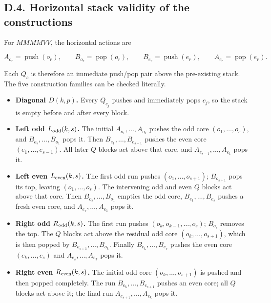 \documentclass[11pt]{article}
\theoremstyle{definition}
\theoremstyle{remark}
\providecommand{\tightlist}{\setlength{\itemsep}{0pt}\setlength{\parskip}{0pt}}
\begin{document}
\subsection{D.4. Horizontal stack validity of the
constructions}\label{d.4.-horizontal-stack-validity-of-the-constructions}

For \(MMMMVV\), the horizontal actions are

\[
A_{o_r}=\operatorname{push}(o_r),\qquad B_{o_r}=\operatorname{pop}(o_r),\qquad
B_{e_r}=\operatorname{push}(e_r),\qquad A_{e_r}=\operatorname{pop}(e_r).
\]

Each \(Q_c\) is therefore an immediate push/pop pair above the
pre-existing stack. The five construction families can be checked
literally.

\begin{itemize}
\tightlist
\item
  \textbf{Diagonal \(D(k,p)\).} Every \(Q_{c_j}\) pushes and immediately
  pops \(c_j\), so the stack is empty before and after every block.
\item
  \textbf{Left odd \(L_{\rm odd}(k,s)\).} The initial
  \(A_{o_1},\ldots,A_{o_s}\) pushes the odd core \((o_1,\ldots,o_s)\),
  and \(B_{o_s},\ldots,B_{o_1}\) pops it. Then
  \(B_{e_1},\ldots,B_{e_{s-1}}\) pushes the even core
  \((e_1,\ldots,e_{s-1})\). All later \(Q\) blocks act above that core,
  and \(A_{e_{s-1}},\ldots,A_{e_1}\) pops it.
\item
  \textbf{Left even \(L_{\rm even}(k,s)\).} The first odd run pushes
  \((o_1,\ldots,o_{s+1})\); \(B_{o_{s+1}}\) pops its top, leaving
  \((o_1,\ldots,o_s)\). The intervening odd and even \(Q\) blocks act
  above that core. Then \(B_{o_s},\ldots,B_{o_1}\) empties the odd core,
  \(B_{e_1},\ldots,B_{e_s}\) pushes a fresh even core, and
  \(A_{e_s},\ldots,A_{e_1}\) pops it.
\item
  \textbf{Right odd \(R_{\rm odd}(k,s)\).} The first run pushes
  \((o_k,o_{k-1},\ldots,o_s)\); \(B_{o_s}\) removes the top. The \(Q\)
  blocks act above the residual odd core \((o_k,\ldots,o_{s+1})\), which
  is then popped by \(B_{o_{s+1}},\ldots,B_{o_k}\). Finally
  \(B_{e_k},\ldots,B_{e_s}\) pushes the even core \((e_k,\ldots,e_s)\)
  and \(A_{e_s},\ldots,A_{e_k}\) pops it.
\item
  \textbf{Right even \(R_{\rm even}(k,s)\).} The initial odd core
  \((o_k,\ldots,o_{s+1})\) is pushed and then popped completely. The run
  \(B_{e_k},\ldots,B_{e_{s+1}}\) pushes an even core; all \(Q\) blocks
  act above it; the final run \(A_{e_{s+1}},\ldots,A_{e_k}\) pops it.
\end{itemize}
\end{document}
